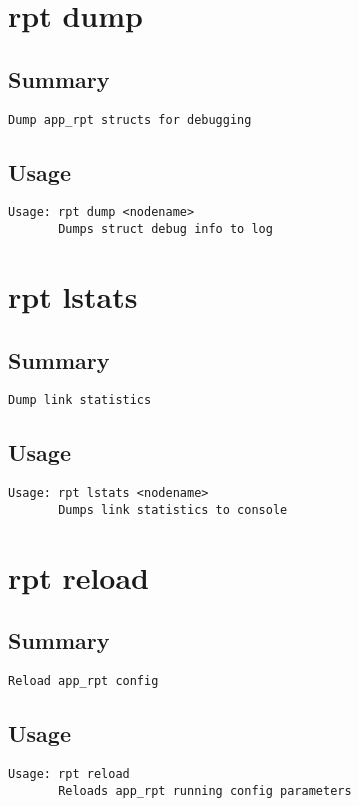 \section{rpt dump}
\subsection{Summary}
\begin{verbatim}
Dump app_rpt structs for debugging
\end{verbatim}
\subsection{Usage}
\begin{verbatim}
Usage: rpt dump <nodename>
       Dumps struct debug info to log

\end{verbatim}


\section{rpt lstats}
\subsection{Summary}
\begin{verbatim}
Dump link statistics
\end{verbatim}
\subsection{Usage}
\begin{verbatim}
Usage: rpt lstats <nodename>
       Dumps link statistics to console

\end{verbatim}


\section{rpt reload}
\subsection{Summary}
\begin{verbatim}
Reload app_rpt config
\end{verbatim}
\subsection{Usage}
\begin{verbatim}
Usage: rpt reload
       Reloads app_rpt running config parameters

\end{verbatim}


